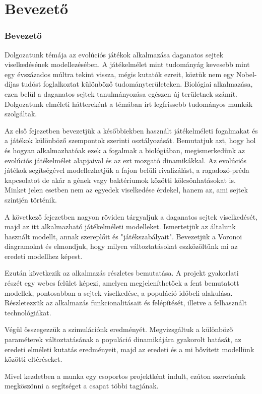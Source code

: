 \section{Bevezető}

\begin{frame}
\frametitle{Bevezető}
Dolgozatunk témája az evolúciós játékok alkalmazása daganatos sejtek viselkedésének modellezésében. A játékelmélet mint tudományág kevesebb mint egy évszázados múltra tekint vissza, mégis kutatók ezreit, köztük nem egy Nobel-díjas tudóst foglalkoztat különböző tudományterületeken. Biológiai alkalmazása, ezen belül a daganatos sejtek tanulmányozása egészen új területnek számít. Dolgozatunk elméleti háttereként a témában írt legfrissebb tudományos munkák szolgáltak.

Az első fejezetben bevezetjük a későbbiekben használt játékelméleti fogalmakat és a játékok különböző szempontok szerinti osztályozását. Bemutatjuk azt, hogy hol és hogyan alkalmazhatóak ezek a fogalmak a biológiában, megismerkedünk az evolúciós játékelmélet alapjaival és az ezt mozgató dinamikákkal. Az evolúciós játékok segítségével modellezhetjük a fajon belüli rivalizálást, a ragadozó-préda kapcsolatot de akár a gének vagy baktériumok közötti kölcsönhatásokat is. Minket jelen esetben nem az egyedek viselkedése érdekel, hanem az, ami sejtek szintjén történik.

A következő fejezetben nagyon röviden tárgyaljuk a daganatos sejtek viselkedését, majd az itt alkalmazható játékelméleti modelleket. Ismertetjük az általunk használt modellt, annak szereplőit és "játékszabályait". Bevezetjük a Voronoi diagramokat és elmondjuk, hogy milyen változtatásokat eszközöltünk mi az eredeti modellhez képest. 

Ezután következik az alkalmazás részletes bemutatása. A projekt gyakorlati részét egy webes felület képezi, amelyen megjeleníthetőek a fent bemutatott modellek, pontosabban a sejtek viselkedése, a populáció időbeli alakulása. Részletezzük az alkalmazás funkcionalitásait és felépítését, illetve a felhasznált technológiákat.

Végül összegezzük a szimulációnk eredményét. Megvizsgáltuk a különböző paraméterek változtatásának a populáció dinamikájára gyakorolt hatását, az eredeti elméleti kutatás eredményeit, majd az eredeti és a mi bővített modellünk közötti eltéréseket.

Mivel kezdetben a munka egy csoportos projektként indult, ezúton szeretnénk megköszönni a segítséget a csapat többi tagjának.
\end{frame}